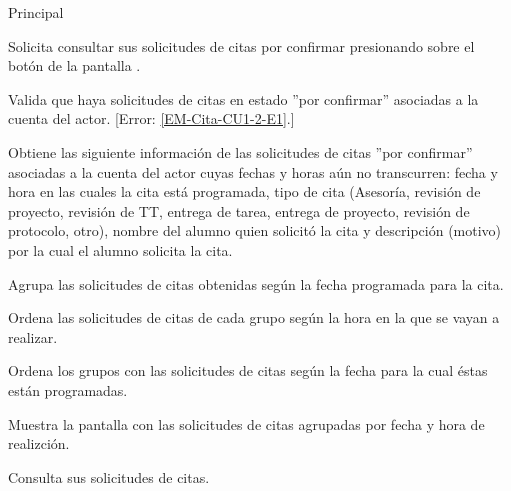 \begin{UCtrayectoria}{Principal}

	\UCpaso [\UCactor] Solicita consultar sus solicitudes de citas por confirmar presionando sobre el botón  de la pantalla .

	\UCpaso Valida que haya solicitudes de citas en estado ''por confirmar'' asociadas a la cuenta del actor. [Error: \ref{EM-Cita-CU1-2-E1}.]

	\UCpaso Obtiene las siguiente información de las solicitudes de citas ''por confirmar'' asociadas a la cuenta del actor cuyas fechas y horas aún no transcurren: fecha y hora en las cuales la cita está programada, tipo de cita (Asesoría, revisión de proyecto, revisión de TT, entrega de tarea, entrega de proyecto, revisión de protocolo, otro), nombre del alumno quien solicitó la cita y descripción (motivo) por la cual el alumno solicita la cita.

	\UCpaso Agrupa las solicitudes de citas obtenidas según la fecha programada para la cita.

	\UCpaso Ordena las solicitudes de citas de cada grupo según la hora en la que se vayan a realizar. 

	\UCpaso Ordena los grupos con las solicitudes de citas según la fecha para la cual éstas están programadas.

	\UCpaso Muestra la pantalla  con las solicitudes de citas agrupadas por fecha y hora de realizción. 

	\UCpaso [\UCactor] Consulta sus solicitudes de citas. 

\end{UCtrayectoria}
